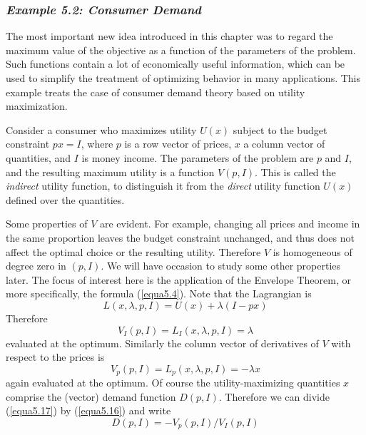 \subsubsection*{\textit{Example 5.2: Consumer Demand}}

The most important new idea introduced in this chapter was to regard the maximum value of the objective as a function of the parameters of the problem. Such functions contain a lot of economically useful information, which can be used to simplify the treatment of optimizing behavior in many applications. This example treats the case of consumer demand theory based on utility maximization.

Consider a consumer who maximizes utility $U(x)$ subject to the budget constraint $px=I$, where $p$ is a row vector of prices, $x$ a column vector of quantities, and $I$ is money income. The parameters of the problem are $p$ and $I$, and the resulting maximum utility is a function $V(p, I)$. This is called the \textit{indirect} utility function, to distinguish it from the \textit{direct} utility function $U(x)$ defined over the quantities.

Some properties of $V$ are evident. For example, changing all prices and income in the same proportion leaves the budget constraint unchanged, and thus does not affect the optimal choice or the resulting utility. Therefore $V$ is homogeneous of degree zero in $(p,I)$. We will have occasion to study some other properties later. The focus of interest here is the application of the Envelope Theorem, or more specifically, the formula (\ref{equa5.4}). Note that the Lagrangian is
\begin{equation*}
   L(x,\lambda,p,I) = U(x) + \lambda(I-px)
\end{equation*}
Therefore
\begin{equation} \label{equa5.16}
   V_I(p,I) = L_I(x,\lambda,p,I) = \lambda
\end{equation}
evaluated at the optimum. Similarly the column vector of derivatives of $V$ with respect to the prices is
\begin{equation} \label{equa5.17}
   V_p(p,I) = L_p(x,\lambda,p,I) = - \lambda x
\end{equation}
again evaluated at the optimum. Of course the utility-maximizing quantities $x$ comprise the (vector) demand function $D(p,I)$. Therefore we can divide (\ref{equa5.17}) by (\ref{equa5.16}) and write
\begin{equation} \label{equa5.18}
   D(p,I) = - V_p(p,I) / V_I(p,I)
\end{equation}

